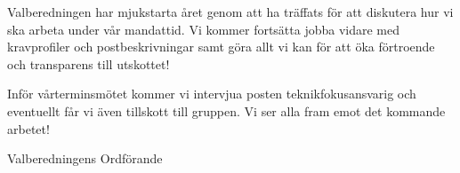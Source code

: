 \documentclass[../_main/handlingar.tex]{subfiles}
\begin{document}
Valberedningen har mjukstarta året genom att ha träffats för att diskutera hur vi ska arbeta under vår mandattid. Vi kommer fortsätta jobba vidare med kravprofiler och postbeskrivningar samt göra allt vi kan för att öka förtroende och transparens till utskottet! 

Inför vårterminsmötet kommer vi intervjua posten teknikfokusansvarig och eventuellt får vi även tillskott till gruppen. Vi ser alla fram emot det kommande arbetet!

\begin{signatures}{1}
    \mvh
    \signature{Axel Voss}{Valberedningens Ordförande}
\end{signatures}
\end{document}
